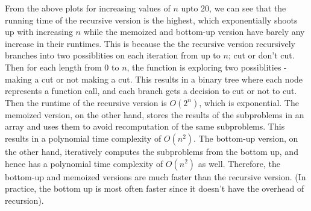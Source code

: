 \documentclass[addpoints]{exam}
\begin{document}
\begin{questions}
\begin{solution}
			From the above plots for increasing values of $n$ upto 20, we can see that the running time of the recursive version is the highest, which exponentially shoots up with increasing $n$ while the memoized and bottom-up version have barely any increase in their runtimes. This is because the the recursive version recursively branches into two possiblities on each iteration from up to $n$; cut or don't cut. Then for each length from 0 to $n$, the function is exploring two possiblities - making a cut or not making a cut. This results in a binary tree where each node represents a function call, and each branch gets a decision to cut or not to cut. Then the runtime of the recursive version is $O(2^n)$, which is exponential. The memoized version, on the other hand, stores the results of the subproblems in an array and uses them to avoid recomputation of the same subproblems. This results in a polynomial time complexity of $O(n^2)$. The bottom-up version, on the other hand, iteratively computes the subproblems from the bottom up, and hence has a polynomial time complexity of $O(n^2)$ as well. Therefore, the bottom-up and memoized versions are much faster than the recursive version. (In practice, the bottom up is most often faster since it doesn't have the overhead of recursion).
    \end{solution}
\end{questions}
\end{document}

